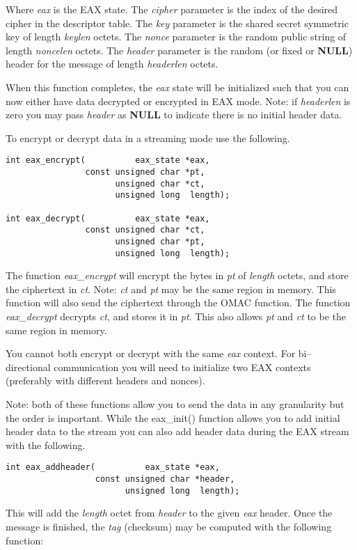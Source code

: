 \documentclass[synpaper]{book}
\begin{document}
Where \textit{eax} is the EAX state.  The \textit{cipher} parameter is the index of the desired cipher in the descriptor table.
The \textit{key} parameter is the shared secret symmetric key of length \textit{keylen} octets.  The \textit{nonce} parameter is the
random public string of length \textit{noncelen} octets.  The \textit{header} parameter is the random (or fixed or \textbf{NULL}) header for the
message of length \textit{headerlen} octets.

When this function completes, the \textit{eax} state will be initialized such that you can now either have data decrypted or
encrypted in EAX mode.  Note: if \textit{headerlen} is zero you may pass \textit{header} as \textbf{NULL} to indicate there is no initial header data.

To encrypt or decrypt data in a streaming mode use the following.
 
\begin{verbatim}
int eax_encrypt(          eax_state *eax,
                const unsigned char *pt,
                      unsigned char *ct,
                      unsigned long  length);

int eax_decrypt(          eax_state *eax,
                const unsigned char *ct,
                      unsigned char *pt,
                      unsigned long  length);
\end{verbatim}
The function \textit{eax\_encrypt} will encrypt the bytes in \textit{pt} of \textit{length} octets, and store the ciphertext in
\textit{ct}.  Note: \textit{ct} and \textit{pt} may be the same region in memory.   This function will also send the ciphertext
through the OMAC function.  The function \textit{eax\_decrypt} decrypts \textit{ct}, and stores it in \textit{pt}.  This also allows
\textit{pt} and \textit{ct} to be the same region in memory.

You cannot both encrypt or decrypt with the same \textit{eax} context.  For bi--directional communication you will need to initialize
two EAX contexts (preferably with different headers and nonces).

Note: both of these functions allow you to send the data in any granularity but the order is important.  While
the eax\_init() function allows you to add initial header data to the stream you can also add header data during the
EAX stream with the following.

\begin{verbatim}
int eax_addheader(          eax_state *eax,
                  const unsigned char *header,
                        unsigned long  length);
\end{verbatim}
This will add the \textit{length} octet from \textit{header} to the given \textit{eax} header.  Once the message is finished, the
\textit{tag} (checksum) may be computed with the following function:
\end{document}
